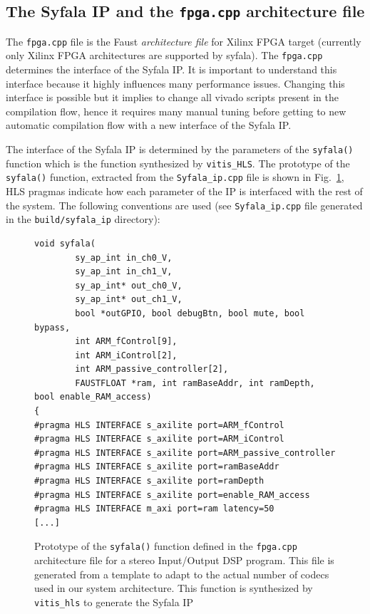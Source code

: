 \documentclass[11pt]{article}
\numberwithin{equation}{section}
\numberwithin{figure}{section}
\begin{document}
\subsection{The Syfala IP and the {\tt fpga.cpp} architecture file}
\label{sec:fpga}
The {\tt fpga.cpp} file is the Faust {\em architecture file} for Xilinx  FPGA target  (currently only Xilinx FPGA architectures are supported by syfala). The {\tt fpga.cpp} determines the interface of the Syfala IP. It is important to understand this interface because it highly influences many performance issues. Changing this interface is possible but it implies to change all vivado scripts present in the compilation flow, hence it requires many manual tuning before getting to new automatic compilation flow with a new interface of the Syfala IP.

The interface of the Syfala IP is determined by the parameters of the {\tt syfala()} function which is the function synthesized by {\tt vitis\_HLS}. The prototype of the {\tt syfala()} function,  extracted from the {\tt Syfala\_ip.cpp} file is shown in Fig.~\ref{fig:interface}, HLS pragmas indicate how each parameter of the IP is interfaced with the rest of the system. The  following conventions are used (see {\tt Syfala\_ip.cpp} file generated in the {\tt build/syfala\_ip} directory):

\begin{figure}
\begin{boxedminipage}{\textwidth}
    \small
\begin{verbatim}
void syfala(
        sy_ap_int in_ch0_V,
        sy_ap_int in_ch1_V,
        sy_ap_int* out_ch0_V,
        sy_ap_int* out_ch1_V,
        bool *outGPIO, bool debugBtn, bool mute, bool bypass,
        int ARM_fControl[9],
        int ARM_iControl[2],
        int ARM_passive_controller[2],
        FAUSTFLOAT *ram, int ramBaseAddr, int ramDepth, bool enable_RAM_access)
{
#pragma HLS INTERFACE s_axilite port=ARM_fControl
#pragma HLS INTERFACE s_axilite port=ARM_iControl
#pragma HLS INTERFACE s_axilite port=ARM_passive_controller
#pragma HLS INTERFACE s_axilite port=ramBaseAddr
#pragma HLS INTERFACE s_axilite port=ramDepth
#pragma HLS INTERFACE s_axilite port=enable_RAM_access
#pragma HLS INTERFACE m_axi port=ram latency=50
[...]
\end{verbatim}
\end{boxedminipage}
\caption{Prototype of the {\tt syfala()} function defined in the {\tt fpga.cpp} architecture file for a stereo Input/Output DSP program. This file is generated from a template to adapt to the actual number of codecs used in our system architecture. This function is synthesized by {\tt vitis\_hls} to generate the Syfala IP}
\label{fig:interface}
\end{figure}
  
\end{document}
